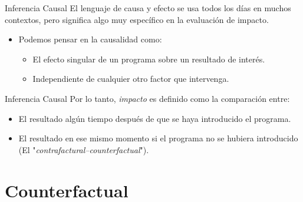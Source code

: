 \documentclass[11pt, aspectratio=169, compress]{beamer}
\begin{document}
\begin{frame}{Inferencia Causal}
El lenguaje de causa y efecto se usa todos los días en muchos
contextos, pero significa algo muy específico en la evaluación de impacto.

\begin{itemize}
\item Podemos pensar en la causalidad como: 
\begin{itemize}
	\item El efecto singular de un programa sobre un resultado de interés.
	\item Independiente de cualquier otro factor que intervenga.
\end{itemize}
\end{itemize}
\end{frame}
\begin{frame}{Inferencia Causal}
Por lo tanto, \textit{impacto} es definido como la comparación entre:
\begin{itemize}
	\item El resultado algún tiempo después de que se haya introducido el programa.
	\item El resultado en ese mismo momento si el programa no se hubiera introducido (El "\textit{contrafactural--counterfactual}"). 
\end{itemize}
\end{frame}
\section{Counterfactual}
\end{document}
